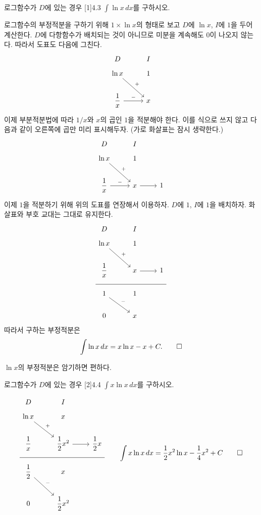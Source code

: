 \documentclass{article}
\begin{document}
\begin{exc}{로그함수가 $D$에 있는 경우 [1]}{4.3}
	$\displaystyle\int\ln x\,dx$를 구하시오.
\end{exc}

\begin{sol}
	로그함수의 부정적분을 구하기 위해 $1\times\ln x$의 형태로 보고 $D$에 $\ln x$, $I$에 $1$을 두어 계산한다. $D$에 다항함수가 배치되는 것이 아니므로 미분을 계속해도 $0$이 나오지 않는다. 따라서 도표도 다음에 그친다.
	\[
		\begin{tikzcd}
			D & I \\[-12pt]
			\ln x \arrow[rd, "+"] & 1 \\
			\dfrac{1}{x} \arrow[r, "-"] & x
		\end{tikzcd}
	\]
	이제 부분적분법에 따라 $1/x$와 $x$의 곱인 $1$을 적분해야 한다. 이를 식으로 쓰지 않고 다음과 같이 오른쪽에 곱만 미리 표시해두자. (가로 화살표는 잠시 생략한다.)
	\[
		\begin{tikzcd}
			D & I & \\[-12pt]
			\ln x \arrow[rd, "+"] & 1 & \\
			\dfrac{1}{x} \arrow[r, "-"] & x \arrow[r] & 1
		\end{tikzcd}
	\]
	이제 $1$을 적분하기 위해 위의 도표를 연장해서 이용하자. $D$에  $1$, $I$에 $1$을 배치하자. 화살표와 부호 교대는 그대로 유지한다.
	\[
		\begin{tikzcd}
			D & I & \\[-12pt]
			\ln x \arrow[rd, "+"] & 1 & \\
			\dfrac{1}{x} & x \arrow[r] & 1 \\[-12pt] \hline \\[-12pt]
			1 \arrow[rd, "-"] & 1 & \\
			0 & x &
		\end{tikzcd}
	\]
	따라서 구하는 부정적분은
	\[
		\int \ln x\,dx =x\ln x-x+C.\qed
	\]
\end{sol}

\begin{remark}
	$\ln x$의 부정적분은 암기하면 편하다.
\end{remark}

\begin{exc}{로그함수가 $D$에 있는 경우 [2]}{4.4}
	$\displaystyle\int x\ln x\,dx$를 구하시오.
\end{exc}

\begin{sol}
	\[
		\begin{tikzcd}
			D & I \\[-12pt]
			\ln x \arrow[rd, "+"] & x & \\
			\dfrac{1}{x} & \dfrac{1}{2}x^2 \arrow[r] & \dfrac{1}{2}x \\[-12pt] \hline \\[-12pt]
			\dfrac{1}{2} \arrow[rd, "-"] & x & \\
			0 & \dfrac{1}{2}x^2 &
		\end{tikzcd}\qquad\int x\ln x\,dx=\frac{1}{2}x^2\ln x-\frac{1}{4}x^2+C\qed
	\]
\end{sol}
\end{document}
